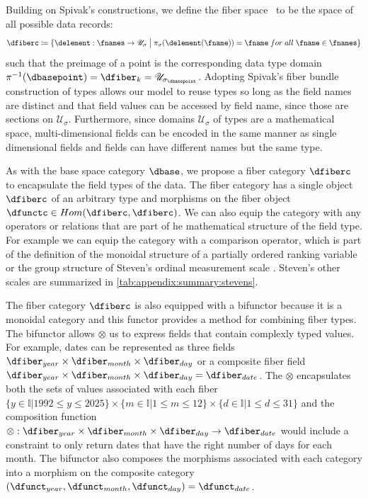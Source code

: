 \documentclass[review]{vgtc}
\theoremstyle{definition}
\theoremstyle{remark}
\begin{document}
Building on Spivak's constructions, we define the \textcolor{fiber}{fiber space} \dfiberc\ to be the space of all possible data records:
\begin{equation}
  \dfiberc \coloneqq \{\delement: \fnames \rightarrow \mathscr{U}_{\sigma} \bigm{\vert} \pi_{\sigma}(\delement(\fname)) = \fname\;for\;all\; \fname \in \fnames \}
\end{equation}
such that the preimage of a point is the corresponding data type domain $\pi^{-1}(\dbasepoint) = \dfiber_{k} = \mathscr{U}_{{\sigma}_{\dbasepoint}}$. Adopting Spivak's fiber bundle construction of types allows our model to reuse types so long as the field names are distinct and that field values can be accessed by field name,  since those are sections on $\mathcal{U}_{\sigma}$. Furthermore, since domains $\mathscr{U}_{{\sigma}}$ of types are a mathematical space, multi-dimensional fields can be encoded in the same manner as single dimensional fields and fields can have different names but the same type.

As with the base space category $\mathcal{\dbase}$, we propose a fiber category $\mathcal{\dfiberc}$ to encapsulate the field types of the data. The fiber category has a single object $\dfiberc$ of an arbitrary type and morphisms on the fiber object $\dfunctc \in Hom(\dfiberc, \dfiberc)$. We can also equip the category with any operators or relations that are part of he mathematical structure of the field type. For example we can equip the category with a comparison operator, which is part of the definition of the monoidal structure of a partially ordered ranking variable \cite{bruggemannRankingPrioritizationMultiindicator2011} or the group structure of Steven's ordinal measurement scale \cite{stevensTheoryScalesMeasurement1946, leaFormalizationMeasurementScale1971, thomasMathematizationNotMeasurement2014}. Steven's other scales are summarized in \autoref{tab:appendix:summary:stevens}.

The fiber category $\mathcal{\dfiberc}$ is also equipped with a bifunctor because it is a monoidal category and this functor provides a method for combining fiber types. The bifunctor allows $\otimes$ us to express fields that contain complexly typed values. For example, dates can be represented as three fields $\dfiber_{year} \times \dfiber_{month} \times \dfiber_{day}$ or a composite fiber field $\dfiber_{year} \times \dfiber_{month} \times \dfiber_{day} = \dfiber_{date}$. The $\otimes$ encapsulates both the sets of values associated with each fiber $\{y \in \mathbb{I}\vert 1992 \leq y \leq 2025\} \times \{m \in \mathbb{I}\vert 1 \leq m \leq 12 \} \times \{d \in \mathbb{I}\vert 1 \leq d \leq 31 \}$ and the composition function $ \otimes: \dfiber_{year} \times \dfiber_{month} \times \dfiber_{day} \rightarrow \dfiber_{date}$
would include a constraint to only return dates that have the right number of days for each month. The bifunctor also composes the morphisms associated with each category into a morphism on the composite category $(\dfunct_{year}, \dfunct_{month}, \dfunct_{day}) = \dfunct_{date}$.
\end{document}
